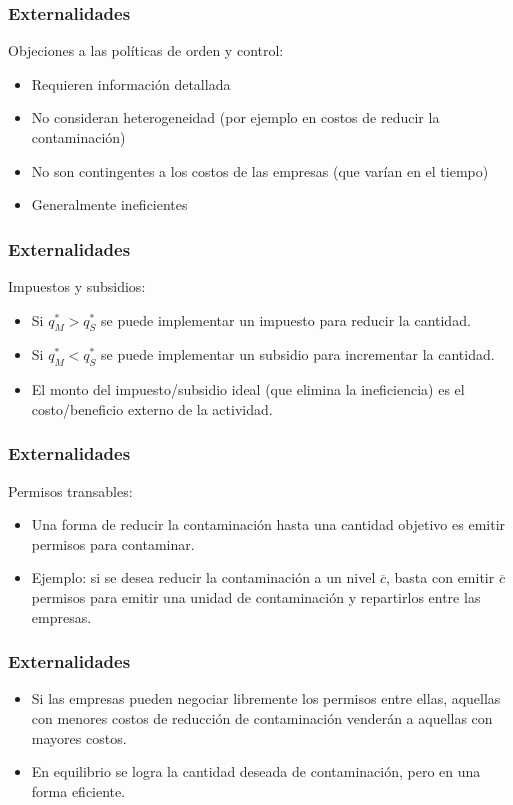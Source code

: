 \documentclass[dvipsnames,table,leqno]{beamer}
\newcommand{\peq}[1]{{\scriptscriptstyle{#1}}}
\begin{document}
		\begin{frame}
			\frametitle{Externalidades}
			Objeciones a las políticas de orden y control:
				\begin{itemize}
					\item Requieren información detallada
					\item No consideran heterogeneidad (por ejemplo en costos de reducir la contaminación)
					\item No son contingentes a los costos de las empresas (que varían en el tiempo)
					\item Generalmente ineficientes
				\end{itemize}
		\end{frame}	

		\begin{frame}
			\frametitle{Externalidades}
			Impuestos y subsidios:
				\begin{itemize}
					\item Si $q^\peq{*}_\peq{M}>q^\peq{*}_\peq{S}$ se puede implementar un impuesto para reducir la cantidad.
					\item Si $q^\peq{*}_\peq{M}<q^\peq{*}_\peq{S}$ se puede implementar un subsidio para incrementar la cantidad.
					\item El monto del impuesto/subsidio ideal (que elimina la ineficiencia) es el costo/beneficio externo de la actividad.
				\end{itemize}
		\end{frame}	
	
		\begin{frame}
			\frametitle{Externalidades}
			Permisos transables:
				\begin{itemize}
					\item Una forma de reducir la contaminación hasta una cantidad objetivo es emitir permisos para contaminar.
					\item Ejemplo: si se desea reducir la contaminación a un nivel $\overline{c}$, basta con emitir $\overline{c}$ permisos para emitir una unidad de contaminación y repartirlos entre las empresas.
				\end{itemize}
		\end{frame}		

		\begin{frame}
			\frametitle{Externalidades}
				\begin{itemize}
					\item Si las empresas pueden negociar libremente los permisos entre ellas, aquellas con menores costos de reducción de contaminación venderán a aquellas con mayores costos.
					\item En equilibrio se logra la cantidad deseada de contaminación, pero en una forma eficiente.
				\end{itemize}
		\end{frame}	
	
\end{document}
